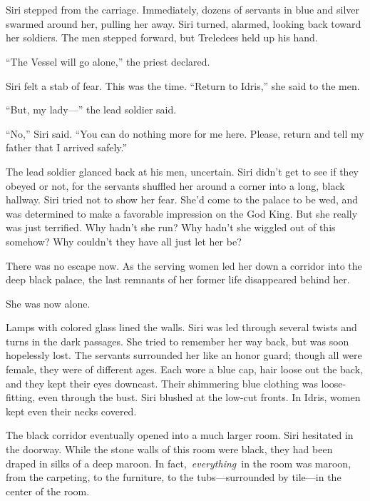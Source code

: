 \chapter{}

Siri stepped from the carriage. Immediately, dozens of servants in blue and silver swarmed around her, pulling her away. Siri turned, alarmed, looking back toward her soldiers. The men stepped forward, but Treledees held up his hand.

“The Vessel will go alone,” the priest declared.

Siri felt a stab of fear. This was the time. “Return to Idris,” she said to the men.

“But, my lady—” the lead soldier said.

“No,” Siri said. “You can do nothing more for me here. Please, return and tell my father that I arrived safely.”

The lead soldier glanced back at his men, uncertain. Siri didn’t get to see if they obeyed or not, for the servants shuffled her around a corner into a long, black hallway. Siri tried not to show her fear. She’d come to the palace to be wed, and was determined to make a favorable impression on the God King. But she really was just terrified. Why hadn’t she run? Why hadn’t she wiggled out of this somehow? Why couldn’t they have all just let her be?

There was no escape now. As the serving women led her down a corridor into the deep black palace, the last remnants of her former life disappeared behind her.

She was now alone.

Lamps with colored glass lined the walls. Siri was led through several twists and turns in the dark passages. She tried to remember her way back, but was soon hopelessly lost. The servants surrounded her like an honor guard; though all were female, they were of different ages. Each wore a blue cap, hair loose out the back, and they kept their eyes downcast. Their shimmering blue clothing was loose-fitting, even through the bust. Siri blushed at the low-cut fronts. In Idris, women kept even their necks covered.

The black corridor eventually opened into a much larger room. Siri hesitated in the doorway. While the stone walls of this room were black, they had been draped in silks of a deep maroon. In fact,~\textit{everything}~in the room was maroon, from the carpeting, to the furniture, to the tubs—surrounded by tile—in the center of the room.

